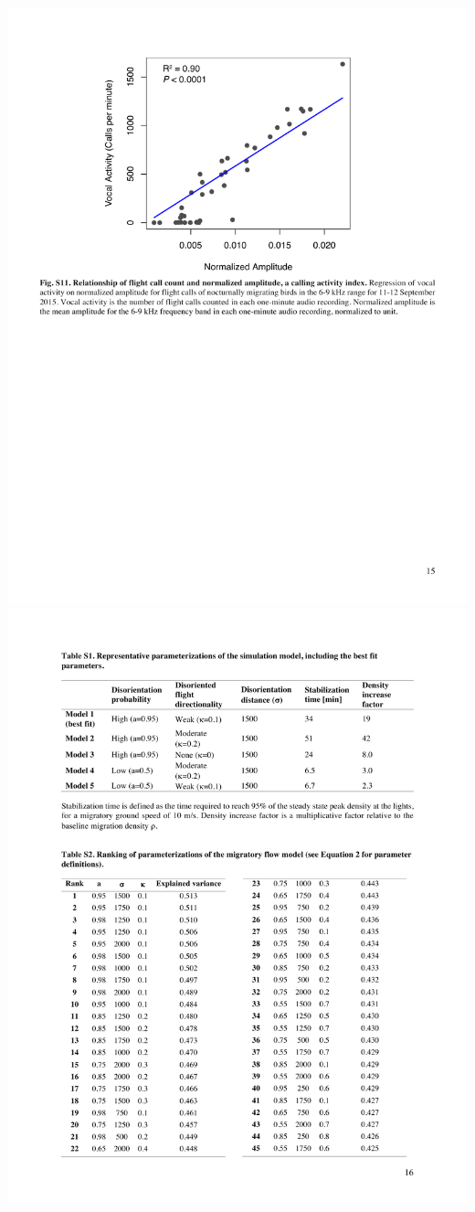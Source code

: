 \documentclass[a4paper, twoside]{templates/ociamthesis}
\begin{document}
\includegraphics[width=1\linewidth]{pdf_chapters/lights/lights_supp_crop_Part19}
\includegraphics[width=1\linewidth]{pdf_chapters/lights/lights_supp_crop_Part20}
\end{document}
